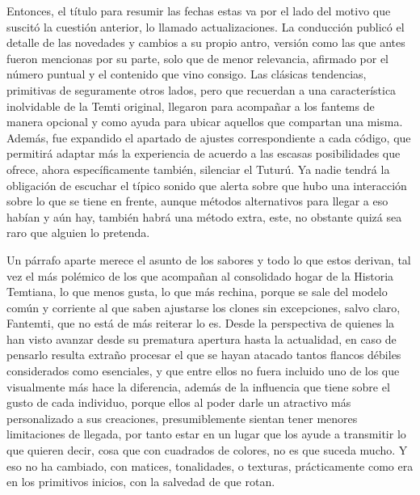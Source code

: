 \documentclass[
]{book}
\begin{document}
Entonces, el título para resumir las fechas estas va por el lado del motivo que suscitó la cuestión anterior, lo llamado actualizaciones. La conducción publicó el detalle de las novedades y cambios a su propio antro, versión como las que antes fueron mencionas por su parte, solo que de menor relevancia, afirmado por el número puntual y el contenido que vino consigo. Las clásicas tendencias, primitivas de seguramente otros lados, pero que recuerdan a una característica inolvidable de la Temti original, llegaron para acompañar a los fantems de manera opcional y como ayuda para ubicar aquellos que compartan una misma. Además, fue expandido el apartado de ajustes correspondiente a cada código, que permitirá adaptar más la experiencia de acuerdo a las escasas posibilidades que ofrece, ahora específicamente también, silenciar el Tuturú. Ya nadie tendrá la obligación de escuchar el típico sonido que alerta sobre que hubo una interacción sobre lo que se tiene en frente, aunque métodos alternativos para llegar a eso habían y aún hay, también habrá una método extra, este, no obstante quizá sea raro que alguien lo pretenda.

Un párrafo aparte merece el asunto de los sabores y todo lo que estos derivan, tal vez el más polémico de los que acompañan al consolidado hogar de la Historia Temtiana, lo que menos gusta, lo que más rechina, porque se sale del modelo común y corriente al que saben ajustarse los clones sin excepciones, salvo claro, Fantemti, que no está de más reiterar lo es. Desde la perspectiva de quienes la han visto avanzar desde su prematura apertura hasta la actualidad, en caso de pensarlo resulta extraño procesar el que se hayan atacado tantos flancos débiles considerados como esenciales, y que entre ellos no fuera incluido uno de los que visualmente más hace la diferencia, además de la influencia que tiene sobre el gusto de cada individuo, porque ellos al poder darle un atractivo más personalizado a sus creaciones, presumiblemente sientan tener menores limitaciones de llegada, por tanto estar en un lugar que los ayude a transmitir lo que quieren decir, cosa que con cuadrados de colores, no es que suceda mucho. Y eso no ha cambiado, con matices, tonalidades, o texturas, prácticamente como era en los primitivos inicios, con la salvedad de que rotan.
\end{document}
